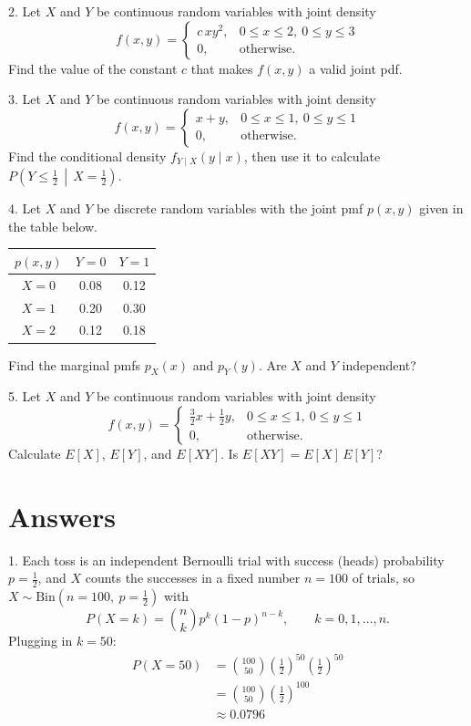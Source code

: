\documentclass{article}
\begin{document}
2. Let $X$ and $Y$ be continuous random variables with joint density
\[
f(x, y) = \begin{cases} c\, x y^2, & 0 \le x \le 2,\ 0 \le y \le 3 \\ 0, & \text{otherwise.} \end{cases}
\]
Find the value of the constant $c$ that makes $f(x, y)$ a valid joint pdf.

3. Let $X$ and $Y$ be continuous random variables with joint density
\[
f(x, y) = \begin{cases} x + y, & 0 \le x \le 1,\ 0 \le y \le 1 \\ 0, & \text{otherwise.} \end{cases}
\]
Find the conditional density $f_{Y \mid X}(y \mid x)$, then use it to calculate $P\left(Y \le \frac{1}{2} \,\middle|\, X = \frac{1}{2}\right)$.

4. Let $X$ and $Y$ be discrete random variables with the joint pmf $p(x, y)$ given in the table below.
\begin{center}
\renewcommand{\arraystretch}{1.3}
\begin{tabular}{c|cc}
$p(x, y)$ & $Y = 0$ & $Y = 1$ \\
\hline
$X = 0$ & 0.08 & 0.12 \\
$X = 1$ & 0.20 & 0.30 \\
$X = 2$ & 0.12 & 0.18 \\
\end{tabular}
\end{center}
Find the marginal pmfs $p_X(x)$ and $p_Y(y)$. Are $X$ and $Y$ independent?

5. Let $X$ and $Y$ be continuous random variables with joint density
\[
f(x, y) = \begin{cases} \frac{3}{2}x + \frac{1}{2}y, & 0 \le x \le 1,\ 0 \le y \le 1 \\ 0, & \text{otherwise.} \end{cases}
\]
Calculate $E[X]$, $E[Y]$, and $E[XY]$. Is $E[XY] = E[X] \, E[Y]$?

\newpage
\section*{Answers}
1. Each toss is an independent Bernoulli trial with success (heads) probability $p = \frac{1}{2}$,
and $X$ counts the successes in a fixed number $n = 100$ of trials, so $X \sim \text{Bin}(n = 100,\ p = \frac{1}{2})$ with
\[
P(X = k) = \binom{n}{k} p^k (1-p)^{n-k}, \qquad k = 0, 1, \dots, n.
\]
Plugging in $k = 50$:
\begin{align*}
P(X = 50) &= \binom{100}{50} \left(\tfrac{1}{2}\right)^{50} \left(\tfrac{1}{2}\right)^{50} \\
&= \binom{100}{50} \left(\tfrac{1}{2}\right)^{100} \\
&\approx 0.0796
\end{align*}
\end{document}
